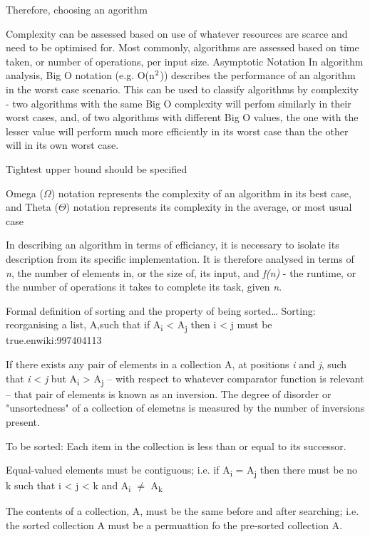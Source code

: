 \documentclass[12pt, a4paper]{article}
\begin{document}
Therefore, choosing an agorithm 

Complexity can be assessed based on use of whatever resources are scarce and need to be optimised for. Most commonly, algorithms are assessed based on time taken, or number of operations, per input size. 
Asymptotic Notation
In algorithm analysis, Big O notation (e.g. O(n$\textsuperscript{2}$)) describes the performance of an algorithm in the worst case scenario. This can be used to classify algorithms by complexity - two algorithms with the same Big O complexity will perfom similarly in their worst cases, and, of two algorithms with different Big O values, the one with the lesser value will perform much more efficiently in its worst case than the other will in its own worst case.

Tightest upper bound should be specified

Omega ($\Omega$) notation represents the complexity of an algorithm in its best case, and Theta ($\Theta$) notation represents its complexity in the average, or most usual case

In describing an algorithm in terms of efficiancy, it is necessary to isolate its description from its specific implementation. It is therefore analysed in terms of \emph{n}, the number of elements in, or the size of, its input, and \emph{f(n)} - the runtime, or the number of operations it takes to complete its task, given \emph{n}.

Formal definition of sorting and the property of being sorted\dots
Sorting: reorganising a list, A,such that if A\textsubscript{i} < A\textsubscript{j} then i < j must be true.enwiki:997404113


If there exists any pair of elements in a collection A, at positions \emph{i} and \emph{j}, such that \emph{i} < \emph{j} but A\textsubscript{i} > A\textsubscript{j} -- with respect to whatever comparator function is relevant -- that pair of elements is known as an inversion. The degree of disorder or "unsortedness" of a collection of elemetns is measured by the number of inversions present.

To be sorted: Each item in the collection is less than or equal to its successor.

Equal-valued elements must be contiguous; i.e. if A\textsubscript{i} = A\textsubscript{j} then there must be no k such that i < j < k and A\textsubscript{i} $\ne$ A\textsubscript{k}

The contents of a collection, A, must be the same before and after searching; i.e. the sorted collection A must be a permuattion fo the pre-sorted collection A.
\end{document}

